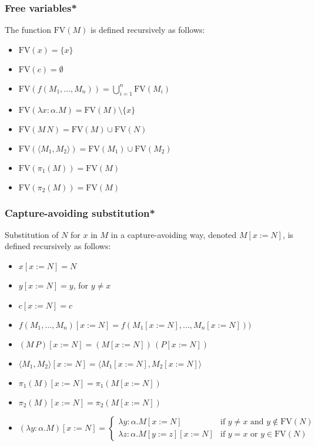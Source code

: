 \documentclass[aspectratio=169]{beamer}
\begin{document}
\begin{frame}
\frametitle{Free variables*}
The function $\text{FV}(M)$ is defined recursively as follows:
\begin{itemize}
    \item $\text{FV}(x) = \{x\}$
    \item $\text{FV}(c) = \emptyset$
    \item $\text{FV}(f(M_1, \ldots, M_n)) = \bigcup_{i=1}^{n} \text{FV}(M_i)$
    \item $\text{FV}(\lambda x: \alpha. M) = \text{FV}(M) \setminus \{x\}$
    \item $\text{FV}(M \, N) = \text{FV}(M) \cup \text{FV}(N)$
    \item $\text{FV}(\langle M_1, M_2 \rangle) = \text{FV}(M_1) \cup \text{FV}(M_2)$
    \item $\text{FV}(\pi_1(M)) = \text{FV}(M)$
    \item $\text{FV}(\pi_2(M)) = \text{FV}(M)$
\end{itemize}
\end{frame}

\begin{frame}
\frametitle{Capture-avoiding substitution*}

Substitution of $N$ for $x$ in $M$ in a capture-avoiding way, denoted $M[x := N]$, is defined recursively as follows:

\begin{itemize}
    \item $x[x := N] = N$
    \item $y[x := N] = y$, for $y \neq x$
    \item $c[x := N] = c$
    \item $f(M_1, \ldots, M_n)[x := N] = f(M_1[x := N], \ldots, M_n[x := N]))$
    \item $(M \, P)[x := N] = (M[x := N]) \, (P[x := N])$
    \item $\langle M_1 , M_2 \rangle[x := N] = \langle M_1[x := N], M_2[x := N] \rangle$
    \item $\pi_1(M)[x := N] = \pi_1(M[x := N])$
    \item $\pi_2(M)[x := N] = \pi_2(M[x := N])$
    \item $(\lambda y : \alpha. M)[x := N] =
    \begin{cases}
    \lambda y : \alpha. M[x := N] & \text{if } y \neq x \text{ and } y \notin \text{FV}(N) \\
    \lambda z : \alpha. M[y := z][x := N] & \text{if } y = x \text{ or } y \in \text{FV}(N)
    \end{cases}$
\end{itemize}
\end{frame}
\end{document}
